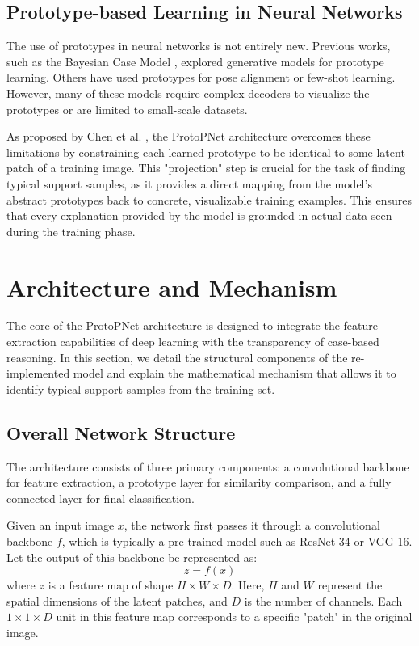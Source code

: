 \documentclass[conference]{IEEEtran}
\begin{document}
\subsection{Prototype-based Learning in Neural Networks}
The use of prototypes in neural networks is not entirely new. Previous works, such as the Bayesian Case Model \cite{b8}, explored generative models for prototype learning. Others have used prototypes for pose alignment or few-shot learning. However, many of these models require complex decoders to visualize the prototypes or are limited to small-scale datasets. 

As proposed by Chen et al. \cite{b9}, the ProtoPNet architecture overcomes these limitations by constraining each learned prototype to be identical to some latent patch of a training image. This "projection" step is crucial for the task of finding typical support samples, as it provides a direct mapping from the model's abstract prototypes back to concrete, visualizable training examples. This ensures that every explanation provided by the model is grounded in actual data seen during the training phase.

\section{Architecture and Mechanism}
\label{sec:architecture}
The core of the ProtoPNet architecture is designed to integrate the feature extraction capabilities of deep learning with the transparency of case-based reasoning. In this section, we detail the structural components of the re-implemented model and explain the mathematical mechanism that allows it to identify typical support samples from the training set.

\subsection{Overall Network Structure}
The architecture consists of three primary components: a convolutional backbone for feature extraction, a prototype layer for similarity comparison, and a fully connected layer for final classification. 

Given an input image $x$, the network first passes it through a convolutional backbone $f$, which is typically a pre-trained model such as ResNet-34 or VGG-16. Let the output of this backbone be represented as:
\begin{equation}
    z = f(x)
\end{equation}
where $z$ is a feature map of shape $H \times W \times D$. Here, $H$ and $W$ represent the spatial dimensions of the latent patches, and $D$ is the number of channels. Each $1 \times 1 \times D$ unit in this feature map corresponds to a specific "patch" in the original image.
\end{document}
